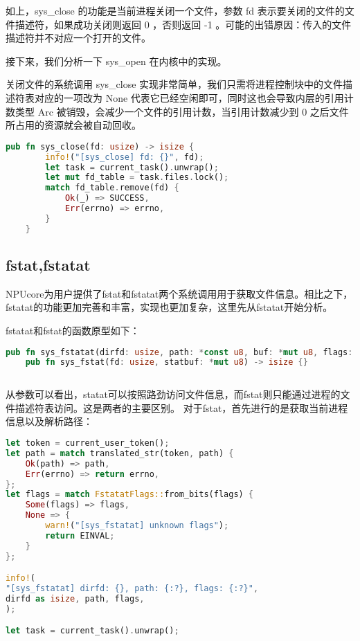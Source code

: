 如上，sys_close 的功能是当前进程关闭一个文件，参数 fd 表示要关闭的文件的文件描述符，如果成功关闭则返回 0 ，否则返回 -1 。可能的出错原因：传入的文件描述符并不对应一个打开的文件。

接下来，我们分析一下 sys_open 在内核中的实现。

关闭文件的系统调用 sys_close 实现非常简单，我们只需将进程控制块中的文件描述符表对应的一项改为 None 代表它已经空闲即可，同时这也会导致内层的引用计数类型 Arc 被销毁，会减少一个文件的引用计数，当引用计数减少到 0 之后文件所占用的资源就会被自动回收。
\begin{lstlisting}[language=rust]
	pub fn sys_close(fd: usize) -> isize {
		info!("[sys_close] fd: {}", fd);
		let task = current_task().unwrap();
		let mut fd_table = task.files.lock();
		match fd_table.remove(fd) {
			Ok(_) => SUCCESS,
			Err(errno) => errno,
		}
	}
\end{lstlisting}

\subsection{fstat,fstatat}
NPUcore为用户提供了fstat和fstatat两个系统调用用于获取文件信息。相比之下，fstatat的功能更加完善和丰富，实现也更加复杂，这里先从fstatat开始分析。

fstatat和fstat的函数原型如下：

\begin{lstlisting}[language={Rust}, label={code:fstat,fstatat},
	caption={fstat,fstatat}]
	pub fn sys_fstatat(dirfd: usize, path: *const u8, buf: *mut u8, flags: u32) -> isize {}
	pub fn sys_fstat(fd: usize, statbuf: *mut u8) -> isize {}
		
\end{lstlisting}

从参数可以看出，statat可以按照路劲访问文件信息，而fstat则只能通过进程的文件描述符表访问。这是两者的主要区别。
对于fstat，首先进行的是获取当前进程信息以及解析路径：

\begin{lstlisting}[language={Rust}, label={code:fstatat part1},
	caption={fstatat_part1}]
    let token = current_user_token();
let path = match translated_str(token, path) {
	Ok(path) => path,
	Err(errno) => return errno,
};
let flags = match FstatatFlags::from_bits(flags) {
	Some(flags) => flags,
	None => {
		warn!("[sys_fstatat] unknown flags");
		return EINVAL;
	}
};

info!(
"[sys_fstatat] dirfd: {}, path: {:?}, flags: {:?}",
dirfd as isize, path, flags,
);

let task = current_task().unwrap();
	
\end{lstlisting}

